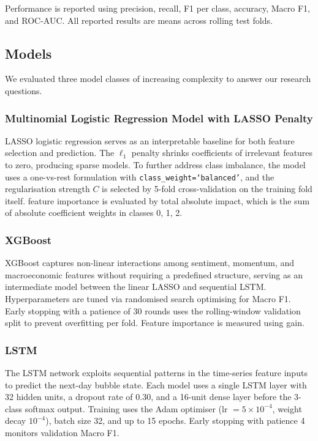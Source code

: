 \documentclass[12pt,a4paper]{article}
\begin{document}
Performance is reported using precision, recall, F1 per class, accuracy, Macro F1, and ROC-AUC. All reported results are means 
across rolling test folds.

\subsection{Models}

We evaluated three model classes of increasing complexity to answer our research questions. 

\subsubsection{Multinomial Logistic Regression Model with LASSO Penalty}

LASSO logistic regression serves as an interpretable baseline for both feature selection and prediction. The $\ell_1$ penalty shrinks coefficients of irrelevant features to zero, producing sparse models. To further address class imbalance, the model uses a one-vs-rest formulation with \texttt{class\_weight=`balanced'}, and the regularisation strength $C$ is selected by 5-fold cross-validation on the training fold itself. feature importance is evaluated by total absolute impact, which is the sum of absolute coefficient weights in classes 0, 1, 2. 



\subsubsection{XGBoost}
XGBoost captures non-linear interactions among sentiment, momentum, and macroeconomic features without requiring a predefined structure, serving as an intermediate model between the linear LASSO and sequential LSTM. Hyperparameters are tuned via randomised search optimising for Macro F1. Early stopping with a patience of 30 rounds uses the rolling-window validation split to prevent overfitting per fold. Feature importance is measured using gain.

\subsubsection{LSTM}
The LSTM network exploits sequential patterns in the time-series feature inputs to predict the next-day bubble state. Each model uses a single LSTM layer with 32 hidden units, a dropout rate of 0.30, and a 16-unit dense layer before the 3-class softmax output. Training uses the Adam optimiser (lr $= 5\times10^{-4}$, weight decay $10^{-4}$), batch size 32, and up to 15 epochs. Early stopping with patience 4 monitors validation Macro F1.
\end{document}
